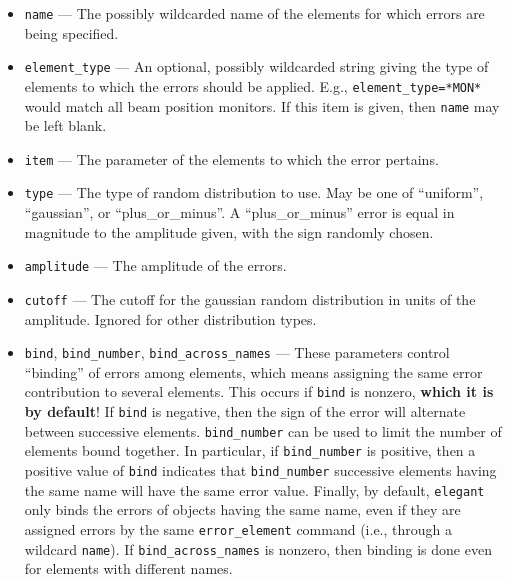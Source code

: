 \documentclass[11pt]{article}
\begin{document}
\begin{itemize}
\item \verb|name| --- The possibly wildcarded name of the elements for which errors are being specified.
\item \verb|element_type| --- An optional, possibly wildcarded string giving the type of elements to
 which the errors should be applied.  E.g., \verb|element_type=*MON*| would match all beam position monitors.
 If this item is given, then \verb|name| may be left blank.
\item \verb|item| --- The parameter of the elements to which the error pertains.
\item \verb|type| --- The type of random distribution to use.  May be one of ``uniform'', ``gaussian'', or ``plus\_or\_minus''.
A ``plus\_or\_minus'' error is equal in magnitude to the amplitude given, with the sign randomly chosen.
\item \verb|amplitude| --- The amplitude of the errors.
\item \verb|cutoff| --- The cutoff for the gaussian random distribution in units of the amplitude.  Ignored for other distribution types.
\item \verb|bind|, \verb|bind_number|, \verb|bind_across_names| ---
These parameters control ``binding'' of errors among elements, which
means assigning the same error contribution to several elements.  This
occurs if \verb|bind| is nonzero, {\bf which it is by default}! If \verb|bind| is negative, then the
sign of the error will alternate between successive elements.
\verb|bind_number| can be used to limit the number of elements bound
together. In particular, if \verb|bind_number| is positive, then a
positive value of \verb|bind| indicates that \verb|bind_number|
successive elements having the same name will have the same error
value.  Finally, by default, {\tt elegant} only binds the errors of
objects having the same name, even if they are assigned errors by 
the same \verb|error_element| command (i.e., through a wildcard \verb|name|).
If \verb|bind_across_names| is nonzero, then binding is done even for elements
with different names.


\end{itemize}
\end{document}

